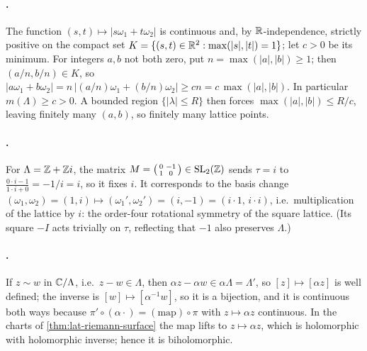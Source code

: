 \paragraph{.}
The function \((s,t) \mapsto |s\omega_1 + t\omega_2|\) is continuous and, by
\(\mathbb{R}\)-independence, strictly positive on the compact set
\(K = \{(s,t) \in \mathbb{R}^2 : \max(|s|,|t|) = 1\}\); let \(c > 0\) be its minimum.
For integers \(a,b\) not both zero, put \(n = \max(|a|,|b|) \ge 1\); then
\((a/n, b/n) \in K\), so \(|a\omega_1 + b\omega_2| = n\,|(a/n)\omega_1 +
(b/n)\omega_2| \ge cn = c\,\max(|a|,|b|)\). In particular
\(m(\Lambda) \ge c > 0\). A bounded region \(\{|\lambda| \le R\}\) then forces
\(\max(|a|,|b|) \le R/c\), leaving finitely many \((a,b)\), so finitely many
lattice points.

\paragraph{.}
For \(\Lambda = \mathbb{Z} + \mathbb{Z} i\), the matrix
\(M = \left(\begin{smallmatrix} 0 & -1 \\ 1 & 0 \end{smallmatrix}\right)
\in \mathrm{SL}_2(\mathbb{Z})\) sends \(\tau = i\) to
\(\frac{0\cdot i - 1}{1 \cdot i + 0} = -1/i = i\), so it fixes \(i\). It
corresponds to the basis change \((\omega_1,\omega_2) = (1,i) \mapsto
(\omega_1', \omega_2') = (i, -1) = (i\cdot 1,\, i\cdot i)\), i.e.\ multiplication
of the lattice by \(i\): the order-four rotational symmetry of the square
lattice. (Its square \(-I\) acts trivially on \(\tau\), reflecting that \(-1\)
also preserves \(\Lambda\).)

\paragraph{.}
If \(z \sim w\) in \(\mathbb{C}/\Lambda\), i.e.\ \(z - w \in \Lambda\), then
\(\alpha z - \alpha w \in \alpha\Lambda = \Lambda'\), so
\([z] \mapsto [\alpha z]\) is well defined; the inverse is
\([w] \mapsto [\alpha^{-1} w]\), so it is a bijection, and it is continuous both
ways because \(\pi' \circ (\alpha \cdot) = (\text{map}) \circ \pi\) with
\(z \mapsto \alpha z\) continuous. In the charts of
\cref{thm:lat-riemann-surface} the map lifts to \(z \mapsto \alpha z\), which is
holomorphic with holomorphic inverse; hence it is biholomorphic.

